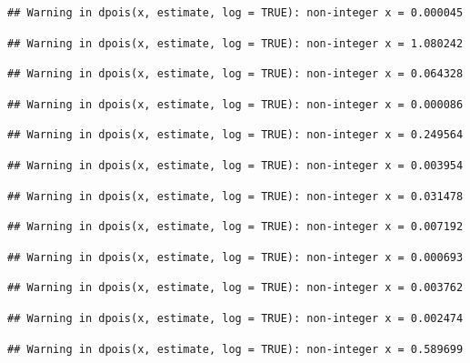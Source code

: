\documentclass[]{article}
\begin{document}
\begin{verbatim}
## Warning in dpois(x, estimate, log = TRUE): non-integer x = 0.000045
\end{verbatim}

\begin{verbatim}
## Warning in dpois(x, estimate, log = TRUE): non-integer x = 1.080242
\end{verbatim}

\begin{verbatim}
## Warning in dpois(x, estimate, log = TRUE): non-integer x = 0.064328
\end{verbatim}

\begin{verbatim}
## Warning in dpois(x, estimate, log = TRUE): non-integer x = 0.000086
\end{verbatim}

\begin{verbatim}
## Warning in dpois(x, estimate, log = TRUE): non-integer x = 0.249564
\end{verbatim}

\begin{verbatim}
## Warning in dpois(x, estimate, log = TRUE): non-integer x = 0.003954
\end{verbatim}

\begin{verbatim}
## Warning in dpois(x, estimate, log = TRUE): non-integer x = 0.031478
\end{verbatim}

\begin{verbatim}
## Warning in dpois(x, estimate, log = TRUE): non-integer x = 0.007192
\end{verbatim}

\begin{verbatim}
## Warning in dpois(x, estimate, log = TRUE): non-integer x = 0.000693
\end{verbatim}

\begin{verbatim}
## Warning in dpois(x, estimate, log = TRUE): non-integer x = 0.003762
\end{verbatim}

\begin{verbatim}
## Warning in dpois(x, estimate, log = TRUE): non-integer x = 0.002474
\end{verbatim}

\begin{verbatim}
## Warning in dpois(x, estimate, log = TRUE): non-integer x = 0.589699
\end{verbatim}
\end{document}
